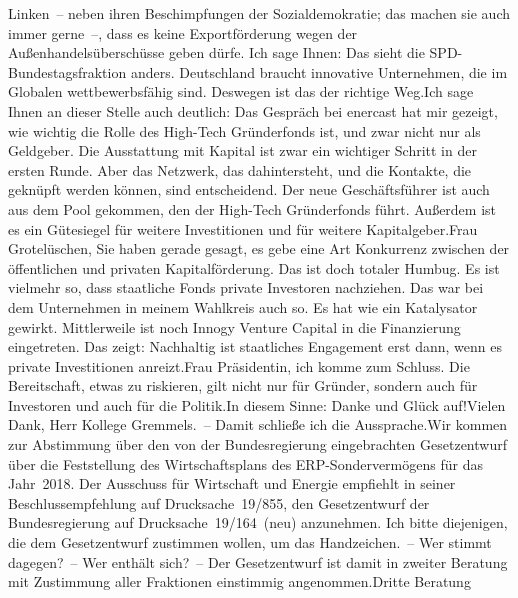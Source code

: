 \documentclass{article}
\begin{document}
Linken – neben ihren Beschimpfungen der Sozialdemokratie; das machen sie auch immer gerne –, dass es keine Exportförderung wegen der Außenhandelsüberschüsse geben dürfe. Ich sage Ihnen: Das sieht die SPD-Bundestagsfraktion anders. Deutschland braucht innovative Unternehmen, die im Globalen wettbewerbsfähig sind. Deswegen ist das der richtige Weg.Ich sage Ihnen an dieser Stelle auch deutlich: Das Gespräch bei enercast hat mir gezeigt, wie wichtig die Rolle des High-Tech Gründerfonds ist, und zwar nicht nur als Geldgeber. Die Ausstattung mit Kapital ist zwar ein wichtiger Schritt in der ersten Runde. Aber das Netzwerk, das dahintersteht, und die Kontakte, die geknüpft werden können, sind entscheidend. Der neue Geschäftsführer ist auch aus dem Pool gekommen, den der High-Tech Gründerfonds führt. Außerdem ist es ein Gütesiegel für weitere Investitionen und für weitere Kapitalgeber.Frau Grotelüschen, Sie haben gerade gesagt, es gebe eine Art Konkurrenz zwischen der öffentlichen und privaten Kapitalförderung. Das ist doch totaler Humbug. Es ist vielmehr so, dass staatliche Fonds private Investoren nachziehen. Das war bei dem Unternehmen in meinem Wahlkreis auch so. Es hat wie ein Katalysator gewirkt. Mittlerweile ist noch Innogy Venture Capital in die Finanzierung eingetreten. Das zeigt: Nachhaltig ist staatliches Engagement erst dann, wenn es private Investitionen anreizt.Frau Präsidentin, ich komme zum Schluss. Die Bereitschaft, etwas zu riskieren, gilt nicht nur für Gründer, sondern auch für Investoren und auch für die Politik.In diesem Sinne: Danke und Glück auf!Vielen Dank, Herr Kollege Gremmels. – Damit schließe ich die Aussprache.Wir kommen zur Abstimmung über den von der Bundesregierung eingebrachten Gesetzentwurf über die Feststellung des Wirtschaftsplans des ERP-Sondervermögens für das Jahr 2018. Der Ausschuss für Wirtschaft und Energie empfiehlt in seiner Beschlussempfehlung auf Drucksache 19/855, den Gesetzentwurf der Bundesregierung auf Drucksache 19/164 (neu) anzunehmen. Ich bitte diejenigen, die dem Gesetzentwurf zustimmen wollen, um das Handzeichen. – Wer stimmt dagegen? – Wer enthält sich? – Der Gesetzentwurf ist damit in zweiter Beratung mit Zustimmung aller Fraktionen einstimmig angenommen.Dritte Beratung
\end{document}
